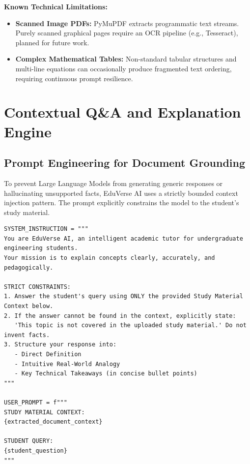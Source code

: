 \documentclass[11pt,a4paper]{report}
\begin{document}
\textbf{Known Technical Limitations:}
\begin{itemize}[noitemsep, topsep=1pt]
    \item \textbf{Scanned Image PDFs:} PyMuPDF extracts programmatic text streams. Purely scanned graphical pages require an OCR pipeline (e.g., Tesseract), planned for future work.
    \item \textbf{Complex Mathematical Tables:} Non-standard tabular structures and multi-line equations can occasionally produce fragmented text ordering, requiring continuous prompt resilience.
\end{itemize}
\clearpage

\chapter{Contextual Q\&A and Explanation Engine}
\label{ch:ai_qa}

\section{Prompt Engineering for Document Grounding}
To prevent Large Language Models from generating generic responses or hallucinating unsupported facts, EduVerse AI uses a strictly bounded context injection pattern. The prompt explicitly constrains the model to the student's study material.

\begin{lstlisting}[caption={Prompt Template for Document-Grounded Contextual Q\&A}]
SYSTEM_INSTRUCTION = """
You are EduVerse AI, an intelligent academic tutor for undergraduate engineering students.
Your mission is to explain concepts clearly, accurately, and pedagogically.

STRICT CONSTRAINTS:
1. Answer the student's query using ONLY the provided Study Material Context below.
2. If the answer cannot be found in the context, explicitly state:
   'This topic is not covered in the uploaded study material.' Do not invent facts.
3. Structure your response into:
   - Direct Definition
   - Intuitive Real-World Analogy
   - Key Technical Takeaways (in concise bullet points)
"""

USER_PROMPT = f"""
STUDY MATERIAL CONTEXT:
{extracted_document_context}

STUDENT QUERY:
{student_question}
"""
\end{lstlisting}
\end{document}
